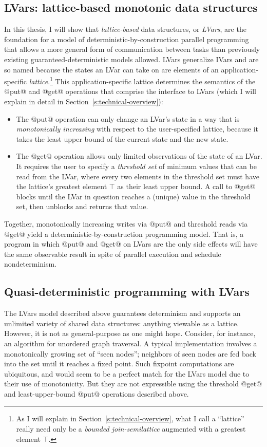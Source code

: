 \documentclass{article}
\begin{document}
\subsection{LVars: lattice-based monotonic data structures}

In this thesis, I will show that \emph{lattice-based} data structures,
or \emph{LVars}, are the foundation for a model of
deterministic-by-construction parallel programming that allows a more
general form of communication between tasks than previously existing
guaranteed-deterministic models allowed.  LVars generalize IVars and
are so named because the states an LVar can take on are elements of an
application-specific \emph{lattice}.\footnote{As I will explain in
  Section~\ref{s:technical-overview}, what I call a ``lattice'' really
  need only be a {\em bounded join-semilattice} augmented with a
  greatest element $\top$.}  This application-specific lattice
determines the semantics of the @put@ and @get@ operations that
comprise the interface to LVars (which I will explain in detail in
Section~\ref{s:technical-overview}):
\begin{itemize}
\item The @put@ operation can only change an LVar's state in a way
  that is {\em monotonically increasing} with respect to the
  user-specified lattice, because it takes the least upper bound of
  the current state and the new state.
\item The @get@ operation allows only limited observations of the
  state of an LVar.  It requires the user to specify a \emph{threshold
    set} of minimum values that can be read from the LVar, where every
  two elements in the threshold set must have the lattice's greatest
  element $\top$ as their least upper bound.  A call to @get@ blocks
  until the LVar in question reaches a (unique) value in the threshold
  set, then unblocks and returns that value.
\end{itemize}
Together, monotonically increasing writes via @put@ and threshold
reads via @get@ yield a deterministic-by-construction programming
model.  That is, a program in which @put@ and @get@ on LVars are the
only side effects will have the same observable result in spite of
parallel execution and schedule nondeterminism.

\subsection{Quasi-deterministic programming with LVars}

The LVars model described above guarantees determinism and supports an
unlimited variety of shared data structures: anything viewable as a
lattice.  However, it is not as general-purpose as one might hope.
Consider, for instance, an algorithm for unordered graph traversal.  A
typical implementation involves a monotonically growing set of ``seen
nodes''; neighbors of seen nodes are fed back into the set until it
reaches a fixed point.  Such fixpoint computations are ubiquitous, and
would seem to be a perfect match for the LVars model due to their use
of monotonicity.  But they are not expressible using the threshold
@get@ and least-upper-bound @put@ operations described above.
\end{document}
